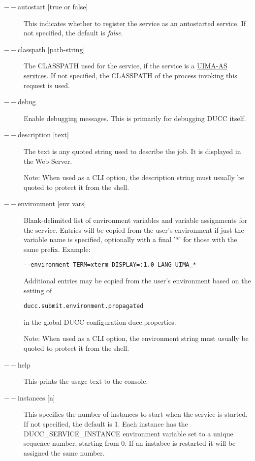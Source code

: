     \begin{description}

        \item[$--$autostart {[true or false]}] This indicates whether to register the service as
          an autostarted service.  If not specified, the default is {\em false}.

        \item[$--$classpath {[path-string]}] The CLASSPATH used for the service, if the service is a
          \hyperref[sec:services.types]{UIMA-AS services}.  If not specified, the CLASSPATH of the
          process invoking this request is used.

        \item[$--$debug ]
          Enable debugging messages. This is primarily for debugging DUCC itself. 
          
        \item[$--$description {[text]}] The text is any quoted string used to describe the job. It is
          displayed in the Web Server.

          Note: When used as a CLI option, the description string must usually be quoted to protect
          it from the shell.
    
        \item[$--$environment {[env vars]}] Blank-delimited list of environment variables and variable
          assignments for the service.
          Entries will be copied from the user's environment if just the variable name is
          specified, optionally with a final '*' for those with the same prefix. Example:
          \begin{verbatim}
--environment TERM=xterm DISPLAY=:1.0 LANG UIMA_*
          \end{verbatim}

          Additional entries may be copied from the user's environment based on the setting of
\begin{verbatim}
ducc.submit.environment.propagated
\end{verbatim}
          in the global DUCC configuration ducc.properties.
        
          Note: When used as a CLI option, the environment string must usually be
          quoted to protect it from the shell.
          
        \item[$--$help ] This prints the usage text to the console.

         \item[$--$instances {[n]}] This specifies the number of instances to start when the service
           is started.  If not specified, the default is 1.
           Each instance has the DUCC\_SERVICE\_INSTANCE environment variable set to a unique sequence
           number, starting from 0.
           If an instabce is restarted it will be assigned the same number.


\end{description}
